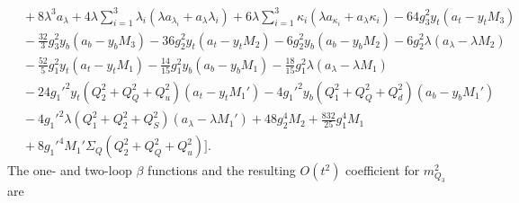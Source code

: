 \documentclass[preprint,amsmath,amssymb,aps,superscriptaddress,prd,showpacs,floatfix,nofootinbib]{revtex4-1}
\begin{document}
\begin{subequations}
\begin{align}
&{}+8\lambda^3a_{\lambda}+4\lambda\sum_{i=1}^3\lambda_i\left ( \lambda a_{\lambda_i}+a_{\lambda}\lambda_i\right )+6\lambda\sum_{i=1}^3\kappa_i\left ( \lambda a_{\kappa_i}+a_{\lambda}\kappa_i\right )-64g_3^2y_t\left ( a_t-y_tM_3\right )\nonumber\\
&{}-\frac{32}{3}g_3^2y_b\left ( a_b-y_bM_3\right )-36g_2^2y_t\left ( a_t-y_tM_2\right )-6g_2^2y_b\left ( a_b-y_bM_2\right )-6g_2^2\lambda\left ( a_\lambda-\lambda M_2\right )\nonumber\\
&{}-\frac{52}{5}g_1^2y_t\left ( a_t-y_tM_1\right )-\frac{14}{15}g_1^2y_b\left ( a_b-y_bM_1\right )-\frac{18}{15}g_1^2\lambda \left ( a_\lambda-\lambda M_1\right )\nonumber\\
&{}-24g_1'^2y_t\left ( Q_2^2+Q_Q^2+Q_u^2\right )\left ( a_t-y_tM_1'\right )-4g_1'^2y_b\left ( Q_1^2+Q_Q^2+Q_d^2\right )\left ( a_b-y_bM_1'\right )\nonumber\\
&{}-4g_1'^2\lambda \left ( Q_1^2+Q_2^2+Q_S^2\right )\left ( a_\lambda-\lambda M_1'\right )+48g_2^4M_2+\frac{832}{25}g_1^4M_1\nonumber\\
&{}+8g_1'^4M_1'\Sigma_Q\left ( Q_2^2+Q_Q^2+Q_u^2\right )\bigg ].\label{eq:USSMTYu22Ot2Coeff}
\end{align}
\end{subequations}
The one- and two-loop $\beta$ functions and the resulting $O(t^2)$ coefficient for $m_{Q_3}^2$ are 
\end{document}
